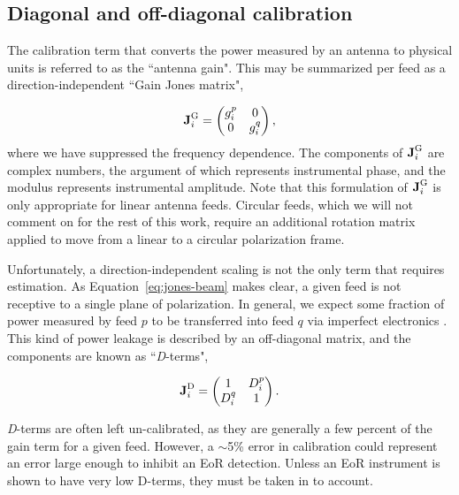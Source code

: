 \subsection{Diagonal and off-diagonal calibration}

The calibration term that converts the power measured by an antenna to physical units is referred to as the ``antenna gain". This may be summarized per feed as a direction-independent ``Gain Jones matrix",

\begin{equation}
\textbf{J}_i^{\rm G} = 
\begin{pmatrix}
g_i^p &0 \\
0 & g_i^q\\
\end{pmatrix},
\label{eq:jones-gains}
\end{equation}
where we have suppressed the frequency dependence. The components of $\textbf{J}_i^{\rm G}$ are complex numbers, the argument of which represents instrumental phase, and the modulus represents instrumental amplitude. Note that this formulation of $\textbf{J}_i^{\rm G}$ is only appropriate for linear antenna feeds. Circular feeds, which we will not comment on for the rest of this work, require an additional rotation matrix applied to move from a linear to a circular polarization frame.

Unfortunately, a direction-independent scaling is not the only term that requires estimation. As Equation~\ref{eq:jones-beam} makes clear, a given feed is not receptive to a single plane of polarization. In general, we expect some fraction of power measured by feed $p$ to be transferred into feed $q$ via imperfect electronics \citep[clever feed designs can attempt to minimize this effect, e.g.][]{Parashare.06, Parsons.10}. This kind of power leakage is described by an off-diagonal matrix, and the components are known as ``\textit{D}-terms",

\begin{equation}
\textbf{J}_i^{\rm D} = 
\begin{pmatrix}
1 & D_i^p \\
D_i^q & 1\\
\end{pmatrix}.
\end{equation}

\textit{D}-terms are often left un-calibrated, as they are generally a few percent of the gain term for a given feed. However, a $\sim$5\% error in calibration could represent an error large enough to inhibit an EoR detection. Unless an EoR instrument is shown to have very low D-terms, they must be taken in to account.


